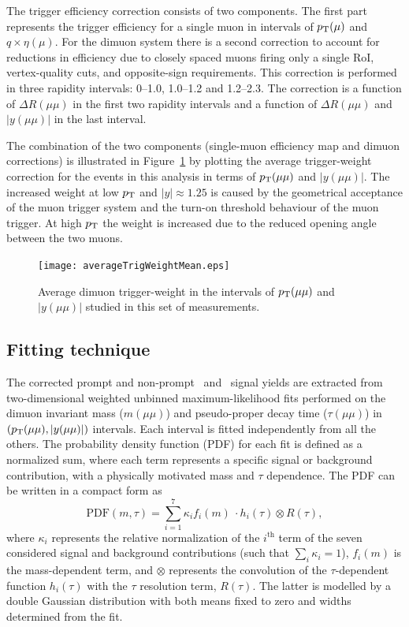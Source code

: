 The trigger efficiency correction consists of two components. The first part represents the trigger efficiency for a 
single muon in intervals of $\mbox{$p_{\text{T}}$} (\mu)$ and $q\times \eta(\mu)$.
For the dimuon system there is a second correction to account for reductions in efficiency due to closely spaced
muons firing only a single RoI, 
vertex-quality cuts, and opposite-sign requirements.
This correction is performed in three rapidity intervals: 0--1.0, 1.0--1.2 and 1.2--2.3. The correction is a function of $\Delta R(\mu\mu)$ 
in the first two rapidity intervals and a function of $\Delta R(\mu\mu)$ and $|y(\mu\mu)|$ in the last interval.

The combination of the two components (single-muon efficiency map and dimuon corrections) is illustrated 
in Figure~\ref{fig:EFmu4DataJpsiTandPCmumupolyL2StarBMaxpt50} by plotting the average trigger-weight correction for the events in this analysis
in terms of $\mbox{$p_{\text{T}}$}(\mu\mu)$ and $|y(\mu\mu)|$.
The increased weight at low $\mbox{$p_{\text{T}}$}$ and $|y|\approx 1.25$ is caused by the geometrical acceptance of the muon trigger system and the turn-on threshold behaviour of the muon trigger. At high $\mbox{$p_{\text{T}}$}$ the weight is increased due to the reduced opening angle between the two muons.


\begin{figure} [!ht]
   \begin{center}
    \texttt{[image: averageTrigWeightMean.eps]}
    \caption{Average dimuon trigger-weight in the intervals of $\mbox{$p_{\text{T}}$} (\mu\mu) $ and $ |y(\mu\mu)|$ studied in this set of measurements. 
    }
    \label{fig:EFmu4DataJpsiTandPCmumupolyL2StarBMaxpt50}
   \end{center}
\end{figure}


\subsection{Fitting technique}
\label{sec:method:fit}

The corrected prompt and non-prompt \jpsi\ and \psiprime\ signal yields are extracted from two-dimensional
weighted unbinned maximum-likelihood fits performed on the dimuon invariant mass ($m(\mu\mu)$)
and pseudo-proper decay time ($\tau(\mu\mu)$) in $(\mbox{$p_{\text{T}}$} (\mu\mu),|y(\mu\mu)|)$ intervals.
Each interval is fitted independently from all the others.
The probability density function (PDF) for each fit is defined as a normalized sum, 
where each term represents a specific signal or background contribution, with a physically motivated mass and $\tau$ dependence.
The PDF can be written in a compact form as
\begin{equation}
\label{eqn:pdf}
\mathrm{PDF}(m,\tau) = \sum_{i=1}^{7} \kappa_i f_i(m) \ \cdot h_i(\tau) \otimes R(\tau),
\end{equation}
where $\kappa_i$ represents the relative normalization of the $i^\mathrm{th}$ term of the seven considered signal and background contributions (such that $\sum_i \kappa_i = 1$), 
$f_i(m)$ is the mass-dependent term, and $\otimes$ represents the convolution of 
the $\tau$-dependent function $h_i(\tau)$ with the $\tau$ resolution term, $R(\tau)$. 
The latter is modelled by a double Gaussian distribution with both means fixed to zero and widths determined from the fit.

